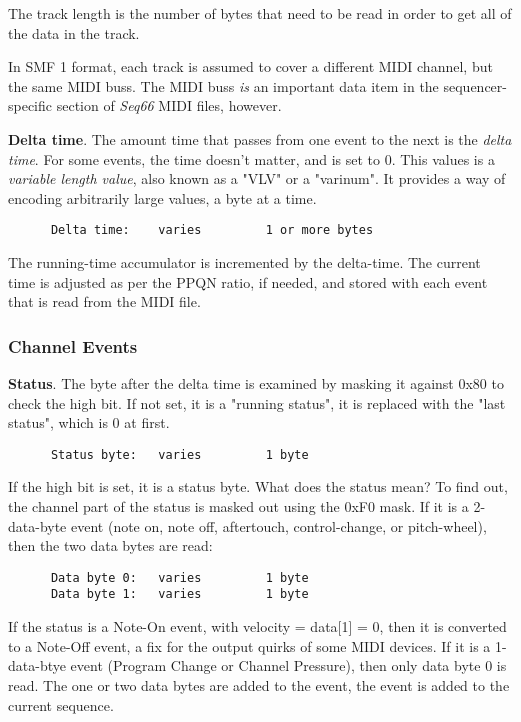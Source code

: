    The track length is the number of bytes that need to be read in order to get
   all of the data in the track.

   In SMF 1 format, each track is assumed to cover a different MIDI channel,
   but the same MIDI buss.
   The MIDI buss \textsl{is} an important data item in the sequencer-specific
   section of \textsl{Seq66} MIDI files, however.

   \textbf{Delta time}.
   The amount time that passes from one event to the next is the
   \textsl{delta time}.
   For some events, the time doesn't matter, and is set to 0.
   This values is a
   \textsl{variable length value}, also known as a "VLV" or a "varinum".   It
   provides a way of encoding arbitrarily large values, a byte at a time.

   \begin{verbatim}
      Delta time:    varies         1 or more bytes
   \end{verbatim}

   The running-time accumulator is incremented by the delta-time.
   The current time is adjusted as per the PPQN ratio, if needed, and stored with
   each event that is read from the MIDI file.

\subsubsection{Channel Events}
\label{subsubsec:midi_format_channel_events}

   \textbf{Status}.
   The byte after the delta time is examined by masking it against 0x80 to check
   the high bit.  If not set, it is a "running status", it is replaced with the
   "last status", which is 0 at first.

   \begin{verbatim}
      Status byte:   varies         1 byte
   \end{verbatim}

   If the high bit is set, it is a status byte.  What does the status mean?  To
   find out, the channel part of the status is masked out using the 0xF0 mask.
   If it is a 2-data-byte event (note on, note off, aftertouch, control-change,
   or pitch-wheel), then the two data bytes are read:

   \begin{verbatim}
      Data byte 0:   varies         1 byte
      Data byte 1:   varies         1 byte
   \end{verbatim}

   If the status is a Note-On event, with velocity = data[1] = 0,
   then it is converted to a Note-Off event, a fix for the output quirks of
   some MIDI devices.
   If it is a 1-data-btye event (Program Change or Channel Pressure), then only
   data byte 0 is read.
   The one or two data bytes are added to the event,
   the event is added to the current sequence.

